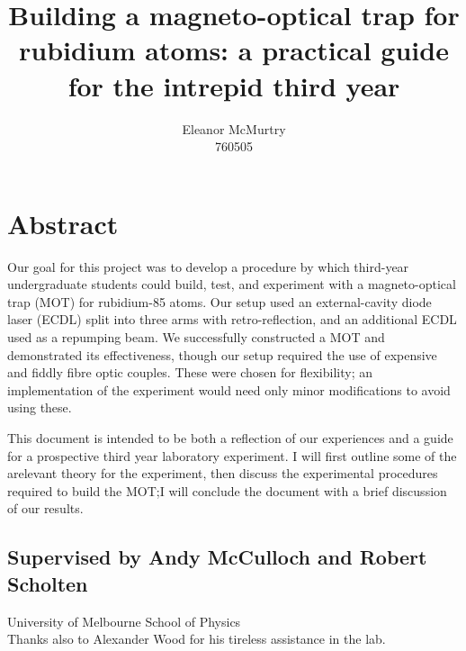 \documentclass[11pt,twoside,a4paper]{article}
\author{Eleanor McMurtry\\760505}
\title{Building a magneto-optical trap for rubidium atoms: a practical guide for the intrepid third year}
\begin{document}
\maketitle
\section*{Abstract}
Our goal for this project was to develop a procedure by which third-year undergraduate students could
build, test, and experiment with a magneto-optical trap (MOT) for rubidium-85 atoms. Our setup used an external-cavity diode laser (ECDL)
split into three arms with retro-reflection, and an additional ECDL used as a repumping beam.
We successfully constructed a MOT and demonstrated its effectiveness, though our setup required the use of expensive and fiddly fibre optic couples.
These were chosen for flexibility; an implementation of the experiment would need only minor modifications
to avoid using these.

This document is intended to be both a reflection of our experiences and a guide for a prospective
third year laboratory experiment. I will first outline some of the arelevant theory for the experiment,
then discuss the experimental procedures required to build the MOT;\@ I will conclude the document with a brief
discussion of our results.

\begin{center}    
\subsection*{Supervised by Andy McCulloch and Robert Scholten}
University of Melbourne School of Physics\\
Thanks also to Alexander Wood for his tireless assistance in the lab.
\end{center}
\pagebreak
\tableofcontents
\vfill
\pagebreak
\end{document}
